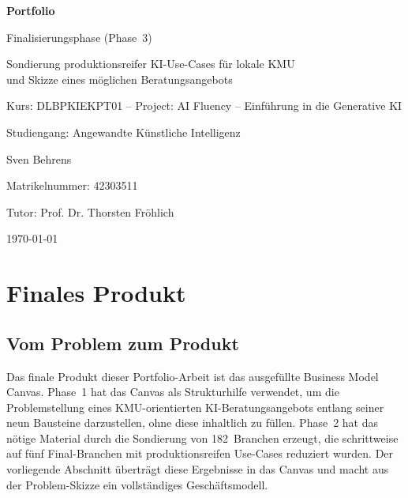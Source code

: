 \documentclass[a4paper,11pt]{article}
\begin{document}
\begin{titlepage}
    \thispagestyle{empty}
    \centering
    \vspace*{5cm}
    {\Huge\bfseries Portfolio \par}
    \vspace{0.3cm}
    {\Large Finalisierungsphase (Phase~3) \par}
    \vspace{1cm}
    {\large Sondierung produktionsreifer KI-Use-Cases für lokale KMU \\ und Skizze eines möglichen Beratungsangebots \par}
    \vspace{1.5cm}
    {\large Kurs: DLBPKIEKPT01 -- Project: AI Fluency -- Einführung in die Generative KI \par}
    \vspace{0.5cm}
    {\large Studiengang: Angewandte Künstliche Intelligenz \par}
    \vspace{0.5cm}
    {\large Sven Behrens \par}
    \vspace{0.5cm}
    {\large Matrikelnummer: 42303511 \par}
    \vspace{0.5cm}
    {\large Tutor: Prof. Dr. Thorsten Fröhlich \par}
    \vspace{0.5cm}
    {\large \today \par}
\end{titlepage}

\setcounter{page}{1}

\tableofcontents
\newpage

\setcounter{page}{1}

\section{Finales Produkt}

\subsection{Vom Problem zum Produkt}

Das finale Produkt dieser Portfolio-Arbeit ist das ausgefüllte Business
Model Canvas. Phase~1 hat das Canvas als Strukturhilfe verwendet, um die
Problemstellung eines KMU-orientierten KI-Beratungsangebots entlang seiner
neun Bausteine darzustellen, ohne diese inhaltlich zu füllen. Phase~2 hat
das nötige Material durch die Sondierung von 182~Branchen erzeugt, die
schrittweise auf fünf Final-Branchen mit produktionsreifen Use-Cases
reduziert wurden. Der vorliegende Abschnitt überträgt diese Ergebnisse in
das Canvas und macht aus der Problem-Skizze ein vollständiges
Geschäftsmodell.
\end{document}
